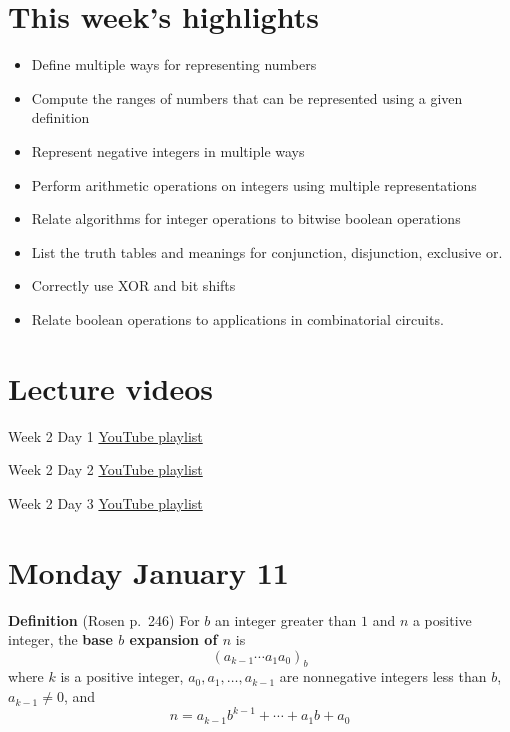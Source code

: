 \documentclass[12pt, oneside]{article}
\begin{document}
\begin{flushright}
\end{flushright}

\section*{This week's highlights}
\begin{itemize}
\item Define multiple ways for representing numbers
\item Compute the ranges of numbers that can be represented using a given definition
\item Represent negative integers in multiple ways
\item Perform arithmetic operations on integers using multiple representations
\item Relate algorithms for integer operations to bitwise boolean operations
\item List the truth tables and meanings for conjunction, disjunction, exclusive or.
\item Correctly use XOR and bit shifts
\item Relate boolean operations to applications in combinatorial circuits.
\end{itemize}

\section*{Lecture videos}
Week 2 Day 1
\href{https://www.youtube.com/playlist?list=PLML4QilACLk6cXlocBCPCFS9vn_BZmkFa}{YouTube playlist}

Week 2 Day 2
\href{https://youtube.com/playlist?list=PLML4QilACLk5NUKPvXRmw-9FRh2dCOVEU}{YouTube playlist}

Week 2 Day 3
\href{https://youtube.com/playlist?list=PLML4QilACLk4uSylet-RB8mf4bMueVFgK}{YouTube playlist}

\newpage
\section*{Monday January 11}
{\bf Definition} (Rosen p.\ 246) For $b$ an integer greater than $1$ and $n$ a positive integer, 
the {\bf base $b$ expansion of $n$}  is
\[
(a_{k-1} \cdots a_1 a_0)_b
\]
where $k$ is a positive integer, $a_0, a_1, \ldots, a_{k-1}$ are nonnegative integers less than $b$, $a_{k-1} \neq  0$, and
\[
n =  a_{k-1} b^{k-1} + \cdots + a_1b + a_0
\]
\end{document}
